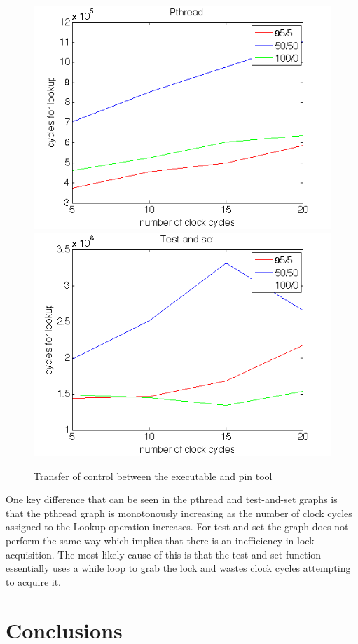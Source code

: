 \documentclass{article}
\begin{document}
\begin{figure}[H]
\begin{center}
\includegraphics[scale=0.5]{images/pthread}
\includegraphics[scale=0.5]{images/test-and-set}
\end{center}
\caption{Transfer of control between the executable and pin tool}
\label{pthreadvsts}
\end{figure}

One key difference that can be seen in the pthread and test-and-set graphs is that the pthread graph is monotonously increasing as the number of clock cycles assigned to the Lookup operation increases.
For test-and-set the graph does not perform the same way which implies that there is an inefficiency in lock acquisition.  
The most likely cause of this is that the test-and-set function essentially uses a while loop to grab the lock and wastes clock cycles attempting to acquire it.

\section{Conclusions}\label{sec:conclusion}





\end{document}
